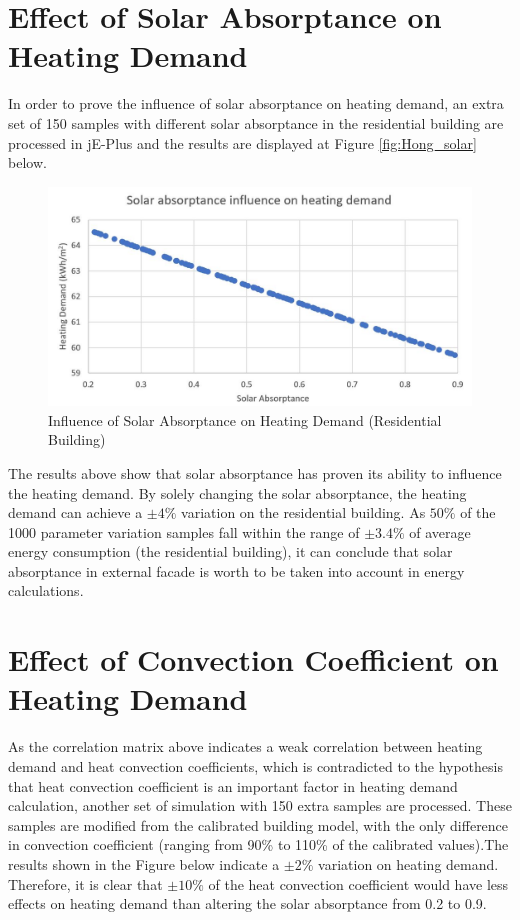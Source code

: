 \documentclass[a4paper, oneside]{discothesis}
\begin{document}
  	
    \section{Effect of Solar Absorptance on Heating Demand}
			In order to prove the influence of solar absorptance on heating demand, an extra set of 150 samples with different solar absorptance in the residential building are processed in jE-Plus and the results are displayed at Figure \ref{fig:Hong_solar} below.\\
			
    	    \begin{figure}[htbp]
    		\centering
    		\includegraphics[scale=0.5]{Solar_HeatingDemand.JPG}
    		\caption{Influence of Solar Absorptance on Heating Demand (Residential Building)}
    		\label{fig:Hongg_solar}
    		\end{figure}			
        
        The results above show that solar absorptance has proven its ability to influence the heating demand. By solely changing the solar absorptance, the heating demand can achieve a $\pm 4\%$ variation on the residential building. As $50\%$ of the 1000 parameter variation samples fall within the range of $\pm 3.4\%$ of average energy consumption (the residential building), it can conclude that solar absorptance in external facade is worth to be taken into account in energy calculations.

	\section{Effect of Convection Coefficient on Heating Demand}
        	As the correlation matrix above indicates a weak correlation between heating demand and heat convection coefficients, which is contradicted to the hypothesis that heat convection coefficient is an important factor in heating demand calculation, another set of simulation with 150 extra samples are processed. These samples are modified from the calibrated building model, with the only difference in convection coefficient (ranging from 90\% to 110\% of the calibrated values).The results shown in the Figure below indicate a $\pm 2\%$ variation on heating demand. Therefore, it is clear that $\pm 10\%$ of the heat convection coefficient would have less effects on heating demand than altering the solar absorptance from 0.2 to 0.9. \\ 
        	
\end{document}

